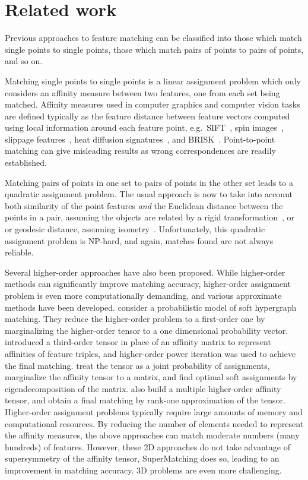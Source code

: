 \section{Related work}
\label{sec:related}

Previous approaches to feature matching can be classified into those which match single points to single points, those which match pairs of points to pairs of points, and so on.

Matching single points to single points is a linear assignment problem which only considers an affinity measure between two features, one from each set being matched.
Affinity measures used in  computer graphics and computer vision tasks are defined typically as the feature distance between feature vectors computed using local information around each feature point,
e.g.\ SIFT~\cite{Lowe04}, spin images~\cite{Johnson99}, slippage features~\cite{Bokeloh08}, heat diffusion signatures~\cite{Sun09}, and BRISK~\cite{Leutenegger11}.
Point-to-point matching can give misleading results as wrong correspondences are readily established.

Matching pairs of points in one set to pairs of points in the other set leads to a quadratic assignment problem.
The usual approach is now to take into account both similarity of the point features \emph{and} the Euclidean distance between the points in a pair,
assuming the objects are related by a rigid transformation~\cite{Leordeanu05,Cour06}, or or geodesic distance, assuming isometry~\cite{li08,Tevs09,Ovsjanikov10,Tevs11,SahilliogluY11,Windheuser11}.
Unfortunately, this quadratic assignment problem is NP-hard, and again, matches found
are not always reliable.

Several higher-order approaches have also been proposed.
While higher-order methods can significantly improve matching accuracy,
higher-order assignment problem is even more computationally demanding, and various approximate methods have been developed.
\cite{Zass08} consider a probabilistic model of soft hypergraph matching.
They reduce the higher-order problem to a first-order one by marginalizing the higher-order tensor to a one dimensional probability vector.
\cite{Duchenne09} introduced a third-order tensor in place of an affinity matrix to represent affinities of feature triples,
and higher-order power iteration was used to achieve the final matching.
\cite{Chertok10} treat the tensor as a joint probability of assignments, marginalize the affinity tensor to a matrix,
and find optimal soft assignments by eigendecomposition of the matrix.
\cite{Aiping10} also build a multiple higher-order affinity tensor, and obtain a final matching by rank-one approximation of the tensor.
Higher-order assignment problems typically require large amounts of memory and computational resources. By reducing the number of elements needed to represent the affinity measures, the above approaches can match moderate numbers (many hundreds) of features. However, these 2D approaches do not take advantage of supersymmetry of the affinity tensor, SuperMatching does so, leading to an improvement in matching accuracy.
3D problems are even more challenging.

